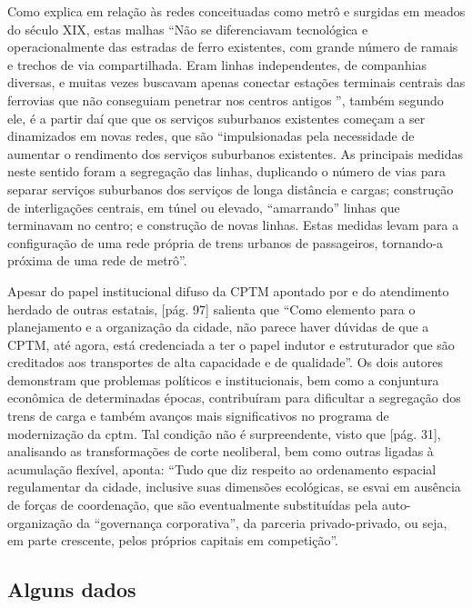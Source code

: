 	Como explica  em relação às redes conceituadas como metrô e surgidas em meados do século XIX, estas malhas ``Não se diferenciavam tecnológica e operacionalmente das estradas de ferro  existentes,  com  grande  número  de  ramais  e  trechos  de  via compartilhada. Eram linhas independentes, de companhias diversas, e muitas  vezes  buscavam  apenas  conectar  estações  terminais  centrais das ferrovias que não conseguiam penetrar nos centros antigos '', também segundo ele, é a partir daí que que os serviços suburbanos existentes começam a ser dinamizados em novas redes, que são ``impulsionadas  pela  necessidade  de  aumentar  o  rendimento  dos serviços  suburbanos  existentes.  As  principais  medidas  neste  sentido foram  a  segregação  das  linhas,  duplicando  o  número  de  vias  para separar serviços suburbanos dos serviços de longa distância e  cargas; construção  de  interligações  centrais,  em  túnel  ou  elevado, “amarrando” linhas que terminavam no centro; e construção de novas linhas. Estas medidas levam para a configuração de uma rede própria de trens urbanos de passageiros, tornando-a próxima de uma rede de metrô''\cite[pág. 32]{Isoda}.
	
	Apesar do papel institucional difuso da CPTM apontado por  e do atendimento herdado de outras estatais, [pág. 97] salienta que ``Como elemento para o planejamento e a organização da cidade, não parece haver dúvidas de que a CPTM, até agora, está credenciada a ter o papel indutor e estruturador que são creditados aos transportes de alta capacidade e de qualidade''. Os dois autores demonstram que problemas políticos e institucionais, bem como a conjuntura econômica de determinadas épocas, contribuíram para dificultar a segregação dos trens de carga e também avanços mais significativos no programa de modernização da \gls{cptm}. Tal condição não é surpreendente, visto que [pág. 31], analisando as transformações de corte neoliberal, bem como outras ligadas à acumulação flexível, aponta: ``Tudo que diz respeito ao ordenamento	espacial regulamentar da cidade, inclusive suas dimensões ecológicas, se esvai em ausência	de forças de coordenação, que são eventualmente substituídas pela auto-organização da “governança corporativa”, da parceria privado-privado, ou seja, em parte crescente, pelos próprios capitais em competição''.
	
	\subsection{Alguns dados}
	
